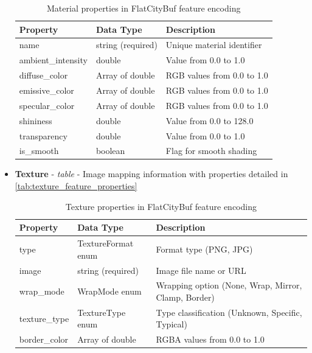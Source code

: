 \begin{itemize}
    \begin{table}[h]
      \centering
      \caption{Material properties in FlatCityBuf feature encoding}
      \label{tab:material_feature_properties}
      \small
      \begin{tabularx}{\textwidth}{@{}llX@{}}
        \toprule
        \textbf{Property} & \textbf{Data Type} & \textbf{Description} \\
        \midrule
        name & string (required) & Unique material identifier \\
        ambient\_intensity & double & Value from 0.0 to 1.0 \\
        diffuse\_color & Array of double & RGB values from 0.0 to 1.0 \\
        emissive\_color & Array of double & RGB values from 0.0 to 1.0 \\
        specular\_color & Array of double & RGB values from 0.0 to 1.0 \\
        shininess & double & Value from 0.0 to 128.0 \\
        transparency & double & Value from 0.0 to 1.0 \\
        is\_smooth & boolean & Flag for smooth shading \\
        \bottomrule
      \end{tabularx}
    \end{table}

  \item \textbf{Texture} - \textit{table} - Image mapping information with properties detailed in \autoref{tab:texture_feature_properties}

    \begin{table}[h]
      \centering
      \caption{Texture properties in FlatCityBuf feature encoding}
      \label{tab:texture_feature_properties}
      \small
      \begin{tabularx}{\textwidth}{@{}llX@{}}
        \toprule
        \textbf{Property} & \textbf{Data Type} & \textbf{Description} \\
        \midrule
        type & TextureFormat enum & Format type (PNG, JPG) \\
        image & string (required) & Image file name or URL \\
        wrap\_mode & WrapMode enum & Wrapping option (None, Wrap, Mirror, Clamp, Border) \\
        texture\_type & TextureType enum & Type classification (Unknown, Specific, Typical) \\
        border\_color & Array of double & RGBA values from 0.0 to 1.0 \\
        \bottomrule
      \end{tabularx}
    \end{table}


\end{itemize}
